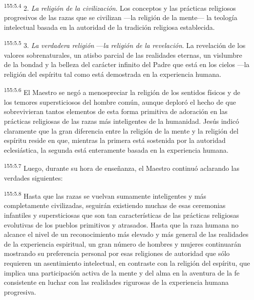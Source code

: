 \par
\textsuperscript{155:5.4} 2. \textit{La religión de la civilización}. Los conceptos y las prácticas religiosos progresivos de las razas que se civilizan ---la religión de la mente--- la teología intelectual basada en la autoridad de la tradición religiosa establecida.

\par
\textsuperscript{155:5.5} 3. \textit{La verdadera religión} ---\textit{la religión de la revelación}. La revelación de los valores sobrenaturales, un atisbo parcial de las realidades eternas, un vislumbre de la bondad y la belleza del carácter infinito del Padre que está en los cielos ---la religión del espíritu tal como está demostrada en la experiencia humana.

\par
\textsuperscript{155:5.6} El Maestro se negó a menospreciar la religión de los sentidos físicos y de los temores supersticiosos del hombre común, aunque deploró el hecho de que sobrevivieran tantos elementos de esta forma primitiva de adoración en las prácticas religiosas de las razas más inteligentes de la humanidad. Jesús indicó claramente que la gran diferencia entre la religión de la mente y la religión del espíritu reside en que, mientras la primera está sostenida por la autoridad eclesiástica, la segunda está enteramente basada en la experiencia humana.

\par
\textsuperscript{155:5.7} Luego, durante su hora de enseñanza, el Maestro continuó aclarando las verdades siguientes:

\par
\textsuperscript{155:5.8} Hasta que las razas se vuelvan sumamente inteligentes y más completamente civilizadas, seguirán existiendo muchas de esas ceremonias infantiles y supersticiosas que son tan características de las prácticas religiosas evolutivas de los pueblos primitivos y atrasados. Hasta que la raza humana no alcance el nivel de un reconocimiento más elevado y más general de las realidades de la experiencia espiritual, un gran número de hombres y mujeres continuarán mostrando su preferencia personal por esas religiones de autoridad que sólo requieren un asentimiento intelectual, en contraste con la religión del espíritu, que implica una participación activa de la mente y del alma en la aventura de la fe consistente en luchar con las realidades rigurosas de la experiencia humana progresiva.

